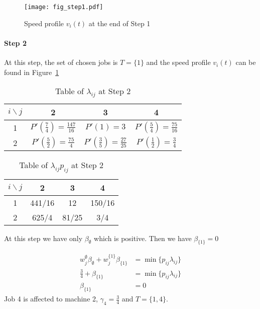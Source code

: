 \documentclass[11pt,a4paper]{article}
\begin{document}
\begin{figure}[H]
\begin{center}
\texttt{[image: fig\_step1.pdf]} 
\end{center}
\caption{Speed profile $v_i(t)$ at the end of Step 1}
\label{speed_profile_step1}
\end{figure}



\paragraph{Step 2}

At this step, the set of chosen jobs is $T=\{ 1  \}$ and the speed profile $v_i(t)$ can be found in Figure~\ref{speed_profile_step1}

\begin{table}[H]
\centering
\begin{tabular}{|c|c|c|c|}
\hline 
$i \backslash j$  & 2 & 3 & 4 \\ 
\hline 
1  & $P'(\frac{7}{4})=\frac{147}{16}$ & $P'(1)=3$ & $P'(\frac{5}{4})=\frac{75}{16}$ \\ 
\hline 
2 & $P'(\frac{5}{2})=\frac{75}{4}$ & $P'(\frac{3}{5})=\frac{27}{25}$ & $P'(\frac{1}{2})=\frac{3}{4}$ \\ 
\hline 
\end{tabular} 
\caption{Table of $\lambda_{ij}$ at Step 2}
\end{table}




\begin{table}[H]
\centering
\begin{tabular}{|c|c|c|c|}
\hline 
$i \backslash j$ & 2 & 3 & 4 \\ 
\hline 
1 & 441/16 & 12 & 150/16 \\ 
\hline 
2  & 625/4 & 81/25 & 3/4 \\ 
\hline 
\end{tabular} 
\caption{Table of $\lambda_{ij}p_{ij}$ at Step 2}
\end{table}

At this step we have only $\beta_{\emptyset}$ which is positive.
Then we have 
$\beta_{ \{ 1  \}}=0$


\begin{align*}
w^{\emptyset}_{j} \beta_{\emptyset}+w^{\{ 1 \}}_{j} \beta_{\{ 1 \}}&=\min \{ p_{ij}\lambda_{ij}   \} \\
\frac{3}{4}+\beta_{\{ 1 \}}&=\min \{ p_{ij}\lambda_{ij}   \}\\
\beta_{\{ 1 \}}&=0
\end{align*}
Job 4 is affected to machine 2, $\gamma_4=\frac{3}{4}$ and $T=\{ 1,4 \}$.
\end{document}
